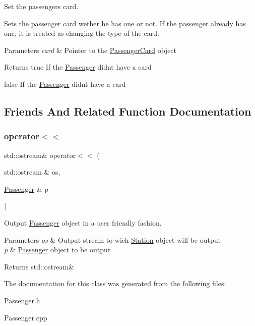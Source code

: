 Set the passenger\textquotesingle{}s card. 

Sets the passenger card wether he has one or not. If the passenger already has one, it is treated as changing the type of the card.


\begin{DoxyParams}{Parameters}
{\em card} & Pointer to the \mbox{\hyperlink{classPassengerCard}{Passenger\+Card}} object \\
\hline
\end{DoxyParams}
\begin{DoxyReturn}{Returns}
true If the \mbox{\hyperlink{classPassenger}{Passenger}} didn\textquotesingle{}t have a card 

false If the \mbox{\hyperlink{classPassenger}{Passenger}} didn\textquotesingle{}t have a card 
\end{DoxyReturn}


\subsection{Friends And Related Function Documentation}
\mbox{\label{classPassenger_a7b1aeaded08562578690b788f39db888}} 
\subsubsection{\texorpdfstring{operator$<$$<$}{operator<<}}
{\footnotesize\ttfamily std\+::ostream\& operator$<$$<$ (\begin{DoxyParamCaption}\item[{std\+::ostream \&}]{os,  }\item[{\mbox{\hyperlink{classPassenger}{Passenger}} \&}]{p }\end{DoxyParamCaption})\hspace{0.3cm}{\ttfamily [friend]}}



Output \mbox{\hyperlink{classPassenger}{Passenger}} object in a user friendly fashion. 


\begin{DoxyParams}{Parameters}
{\em os} & Output stream to wich \mbox{\hyperlink{classStation}{Station}} object will be output \\
\hline
{\em p} & \mbox{\hyperlink{classPassenger}{Passenger}} object to be output \\
\hline
\end{DoxyParams}
\begin{DoxyReturn}{Returns}
std\+::ostream\& 
\end{DoxyReturn}


The documentation for this class was generated from the following files\+:\begin{DoxyCompactItemize}
\item 
Passenger.\+h\item 
Passenger.\+cpp\end{DoxyCompactItemize}
